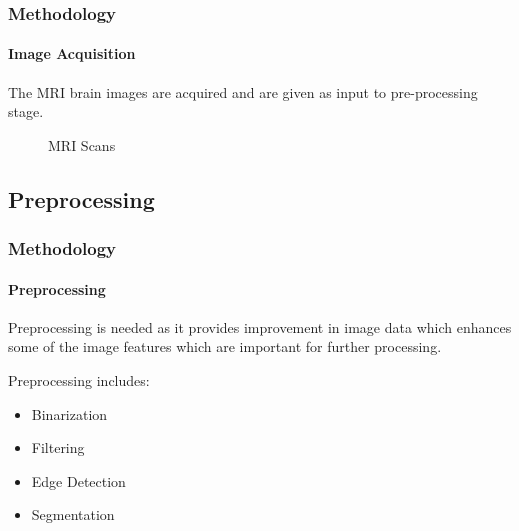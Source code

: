 \documentclass[10pt, aspectratio=169]{beamer}
\begin{document}
	\begin{frame}
		\frametitle{Methodology}
		\framesubtitle{Image Acquisition}
		The MRI brain images are acquired and are given as input to
		pre-processing stage.

		\begin{figure}[H]
			\centering
			\hspace{0.2cm}
			\caption{MRI Scans}
			\label{MRIScans}
		\end{figure}
	\end{frame}

	\subsection{Preprocessing}

	\begin{frame}
		\frametitle{Methodology}
		\framesubtitle{Preprocessing}

		Preprocessing is needed as it provides improvement in image data which
		enhances some of the image features which are important for further
		processing.

		\vspace{1cm}

		Preprocessing includes:

		\begin{itemize}
			\item Binarization
			\item Filtering
			\item Edge Detection
			\item Segmentation
		\end{itemize}
	\end{frame}
\end{document}
